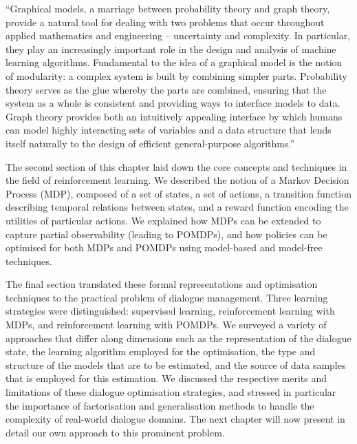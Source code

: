 \begin{quoting}
 ``Graphical models, a marriage between probability theory and graph theory, provide a natural tool for dealing with two problems that occur throughout applied mathematics and engineering -- uncertainty and complexity. In particular, they play an increasingly important role in the design and analysis of machine learning algorithms. Fundamental to the idea of a graphical model is the notion of modularity: a complex system is built by combining simpler parts. Probability theory serves as the glue whereby the parts are combined, ensuring that the system as a whole is consistent and providing ways to interface models to data. Graph theory provides both an intuitively appealing interface by which humans can model highly interacting sets of variables and a data structure that lends itself naturally to the design of efficient general-purpose algorithms.''
 \end{quoting}

The second section of this chapter laid down the core concepts and techniques in the field of reinforcement learning.  We described the notion of a Markov Decision Process (MDP), composed of a set of states, a set of actions, a transition function describing temporal relations between states, and a reward function encoding the utilities of particular actions. We explained how MDPs can be extended to capture partial observability (leading to POMDPs), and how policies can be optimised for both MDPs and POMDPs using model-based and model-free techniques.

The final section translated these formal representations and optimisation techniques to the practical problem of dialogue management.  Three learning strategies were distinguished: supervised learning, reinforcement learning with MDPs, and reinforcement learning with POMDPs.  We surveyed a variety of approaches that differ along dimensions such as the representation of the dialogue state, the learning algorithm employed for the optimisation, the type and structure of the models that are to be estimated, and the source of data samples that is employed for this estimation. We discussed the respective merits and limitations of these dialogue optimisation strategies, and stressed in particular the importance of factorisation and generalisation methods to handle the complexity of real-world dialogue domains.  The next chapter will now present in detail our own approach to this prominent problem.

